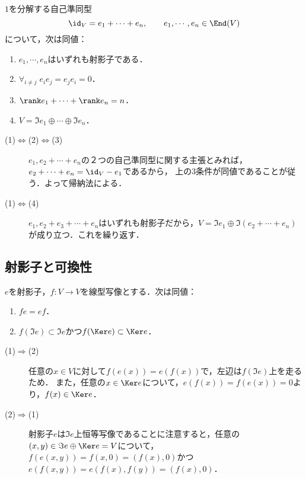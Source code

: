 \documentclass[uplatex, dvipdfmx]{jsreport}
\begin{document}
\begin{proposition}[1を分解する射影子]
    $1$を分解する自己準同型
    \[\id_V=e_1+\cdots+e_n,\qquad e_1,\cdots,e_n\in\End(V)\]
    について，次は同値：
    \begin{enumerate}
        \item $e_1,\cdots,e_n$はいずれも射影子である．
        \item $\forall_{i\ne j}\;e_ie_j=e_je_i=0$．
        \item $\rank e_1+\cdots+\rank e_n=n$．
        \item $V=\Im e_1\oplus\cdots\oplus\Im e_n$．
    \end{enumerate}
\end{proposition}
\begin{Proof}\mbox{}
    \begin{description}
        \item[(1)$\Leftrightarrow$(2)$\Leftrightarrow$(3)] $e_1,e_2+\cdots+e_n$の２つの自己準同型に関する主張とみれば，
        $e_2+\cdots+e_n=\id_V-e_1$であるから，
        上の3条件が同値であることが従う．よって帰納法による．
        \item[(1)$\Leftrightarrow$(4)] $e_1,e_2+e_3+\cdots+e_n$はいずれも射影子だから，$V=\Im e_1\oplus\Im(e_2+\cdots+e_n)$が成り立つ．これを繰り返す．
    \end{description}
\end{Proof}

\subsection{射影子と可換性}

\begin{proposition}
    $e$を射影子，$f:V\to V$を線型写像とする．次は同値：
    \begin{enumerate}
        \item $fe=ef$．
        \item $f(\Im e)\subset\Im e$かつ$f(\Ker e)\subset\Ker e$．
    \end{enumerate}
\end{proposition}
\begin{Proof}\mbox{}
    \begin{description}
        \item[(1)$\Rightarrow$(2)] 任意の$x\in V$に対して$f(e(x))=e(f(x))$で，左辺は$f(\Im e)$上を走るため．
        また，任意の$x\in\Ker e$について，$e(f(x))=f(e(x))=0$より，$f(x)\in\Ker e$．
        \item[(2)$\Rightarrow$(1)] 射影子$e$は$\Im e$上恒等写像であることに注意すると，任意の$(x,y)\in\Im e\oplus\Ker e=V$について，$f(e(x,y))=f(x,0)=(f(x),0)$かつ$e(f(x,y))=e(f(x),f(y))=(f(x),0)$．
    \end{description}
\end{Proof}
\end{document}
